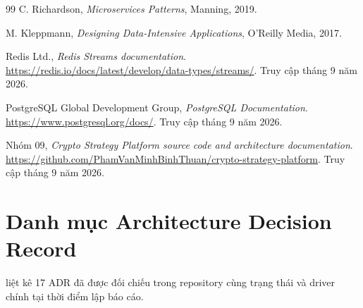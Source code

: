 \documentclass[12pt,a4paper,oneside]{report}
\begin{document}
\begin{thebibliography}{99}
C. Richardson,
\textit{Microservices Patterns}, Manning, 2019.

M. Kleppmann,
\textit{Designing Data-Intensive Applications}, O'Reilly Media, 2017.

Redis Ltd.,
\textit{Redis Streams documentation}.
\url{https://redis.io/docs/latest/develop/data-types/streams/}. Truy cập tháng 9 năm 2026.

PostgreSQL Global Development Group,
\textit{PostgreSQL Documentation}.
\url{https://www.postgresql.org/docs/}. Truy cập tháng 9 năm 2026.

Nhóm 09,
\textit{Crypto Strategy Platform source code and architecture documentation}.
\url{https://github.com/PhamVanMinhBinhThuan/crypto-strategy-platform}. Truy cập tháng 9 năm 2026.

\end{thebibliography}

\appendix

\chapter{Danh mục Architecture Decision Record}
\label{app:adr}

 liệt kê 17 ADR đã được đối chiếu trong repository cùng trạng thái và driver chính tại thời điểm lập báo cáo.
\end{document}

